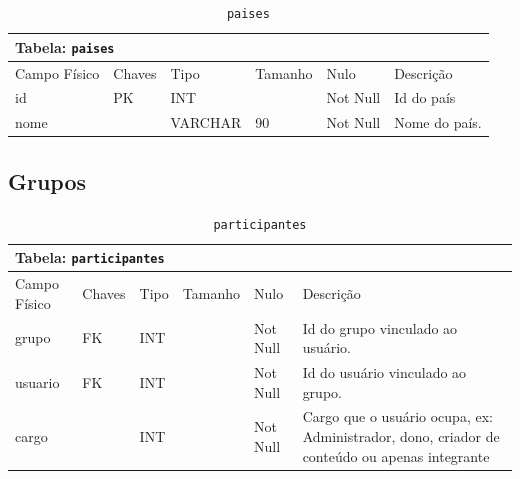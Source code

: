 \documentclass[12pt,a4paper]{article}
\begin{document}
\begin{center}
\begin{table}[h!]
	\caption{\texttt{paises}}
	\label{tabela:paises}
	\begin{tabular}{|p{2.5cm}|p{1cm}|p{1.25cm}|p{1.75cm}|p{1.25cm}|p{5cm}|}\hline	
		\multicolumn{6}{|p{16cm}|}{\cellcolor{cinzaClaro}  \centering Tabela: \texttt{paises}} \\ \hline %
		{\small Campo Físico}   & {\small Chaves} & {\small Tipo} & {\small Tamanho} & {\small Nulo} & {\small Descrição}\\\hline %
		
		{\tiny id} & {\tiny PK} & {\tiny INT} & {\tiny } & {\tiny Not Null} &{\tiny Id do país}\\\hline
		{\tiny nome} & {\tiny } & {\tiny VARCHAR} & {\tiny 90} & {\tiny Not Null} &{\tiny Nome do país.}\\\hline
	
			
	\end{tabular}
\end{table}	
\end{center}

\subsection{Grupos}


\begin{center}
\begin{table}[h!]
	\caption{\texttt{participantes}}
	\label{tabela:participantes}
	\begin{tabular}{|p{2.5cm}|p{1cm}|p{1.25cm}|p{1.75cm}|p{1.25cm}|p{6cm}|}\hline	
		\multicolumn{6}{|p{16cm}|}{\cellcolor{cinzaClaro}  \centering Tabela: \texttt{participantes}} \\ \hline %
		{\small Campo Físico}   & {\small Chaves} & {\small Tipo} & {\small Tamanho} & {\small Nulo} & {\small Descrição}\\\hline %
		
		{\tiny grupo} & {\tiny FK} & {\tiny INT} & {\tiny } & {\tiny Not Null} &{\tiny Id do grupo vinculado ao usuário.}\\\hline
		{\tiny usuario} & {\tiny FK} & {\tiny INT} & {\tiny } & {\tiny Not Null} &{\tiny Id do usuário vinculado ao grupo.}\\\hline
		{\tiny cargo} & {\tiny } & {\tiny INT} & {\tiny } & {\tiny Not Null} &{\tiny Cargo que o usuário ocupa, ex: Administrador, dono, criador de conteúdo ou apenas integrante}\\\hline
			
	\end{tabular}
\end{table}	
\end{center}
\end{document}

